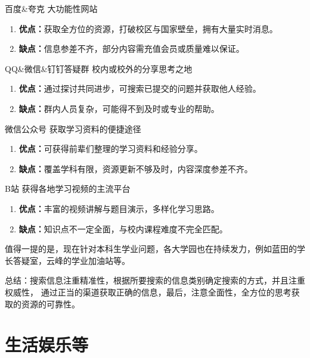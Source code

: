 \begin{jqbox}{百度\&夸克}{}
    大功能性网站
    \tcblower
    \begin{enumerate}
        \item \textbf{优点：}获取全方位的资源，打破校区与国家壁垒，拥有大量实时消息。
        \item \textbf{缺点：}信息参差不齐，部分内容需充值会员或质量难以保证。
    \end{enumerate}
\end{jqbox}

\begin{jqbox}{QQ\&微信\&钉钉答疑群}{}
    校内或校外的分享思考之地
    \tcblower
    \begin{enumerate}
        \item \textbf{优点：}通过探讨共同进步，可搜索已提交的问题并获取他人经验。
        \item \textbf{缺点：}群内人员复杂，可能得不到及时或专业的帮助。
    \end{enumerate}
\end{jqbox}

\begin{jqbox}{微信公众号}{}
    获取学习资料的便捷途径
    \tcblower
    \begin{enumerate}
        \item \textbf{优点：}可获得前辈们整理的学习资料和经验分享。
        \item \textbf{缺点：}覆盖学科有限，资源更新不够及时，内容深度参差不齐。
    \end{enumerate}
\end{jqbox}

\begin{jqbox}{B站}{}
    获得各地学习视频的主流平台
    \tcblower
    \begin{enumerate}
        \item \textbf{优点：}丰富的视频讲解与题目演示，多样化学习思路。
        \item \textbf{缺点：}知识点不一定全面，与校内课程难度不完全匹配。
    \end{enumerate}
\end{jqbox}
值得一提的是，现在针对本科生学业问题，各大学园也在持续发力，例如蓝田的学长答疑室，云峰的学业加油站等。

总结：搜索信息注重精准性，根据所要搜索的信息类别确定搜索的方式，并且注重权威性，
通过正当的渠道获取正确的信息，最后，注意全面性，全方位的思考获取的资源的可靠性。

\section{生活娱乐等}
